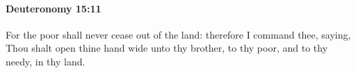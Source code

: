 
		\paragraph{Deuteronomy 15:11} %
			\label{DEUTERONOMY-15-11}

			For the poor shall never cease out of the land: therefore I command thee, saying, Thou shalt open thine hand wide unto thy brother, to thy poor, and to thy needy, in thy land.


